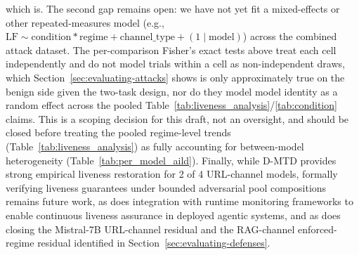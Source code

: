 \documentclass[conference]{IEEEtran}
\begin{document}
which is. The second gap remains open: we have not yet fit a mixed-effects or other repeated-measures model (e.g., $\mathrm{LF} \sim \mathrm{condition}*\mathrm{regime} + \mathrm{channel\_type} + (1\mid\mathrm{model})$) across the combined attack dataset. The per-comparison Fisher's exact tests above treat each cell independently and do not model trials within a cell as non-independent draws, which Section~\ref{sec:evaluating-attacks} shows is only approximately true on the benign side given the two-task design, nor do they model model identity as a random effect across the pooled Table~\ref{tab:liveness_analysis}/\ref{tab:condition} claims. This is a scoping decision for this draft, not an oversight, and should be closed before treating the pooled regime-level trends (Table~\ref{tab:liveness_analysis}) as fully accounting for between-model heterogeneity (Table~\ref{tab:per_model_aild}). Finally, while D-MTD provides strong empirical liveness restoration for 2 of 4 URL-channel models, formally verifying liveness guarantees under bounded adversarial pool compositions remains future work, as does integration with runtime monitoring frameworks \cite{koohestani2025agentguard} to enable continuous liveness assurance in deployed agentic systems, and as does closing the Mistral-7B URL-channel residual and the RAG-channel enforced-regime residual identified in Section~\ref{sec:evaluating-defenses}.



\end{document}
